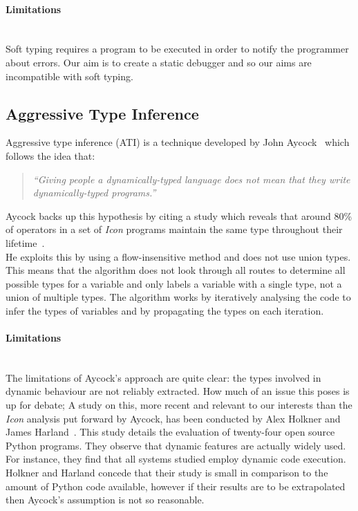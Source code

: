 \documentclass[12pt, titlepage]{article}
\begin{document}
\paragraph{Limitations}\mbox{} \\
Soft typing requires a program to be executed in order to notify the programmer about errors. Our aim is to create a static debugger and so our aims are incompatible with soft typing.

\subsection{Aggressive Type Inference}
Aggressive type inference (ATI) is a technique developed by John Aycock~\cite{aggressiveType} which follows the idea that:
\begin{quote}
	\emph{``Giving people a dynamically-typed language does not mean that they write dynamically-typed programs.''}
\end{quote}
Aycock backs up this hypothesis by citing a study which reveals that around 80\% of operators in a set of \textit{Icon} programs maintain the same type throughout their lifetime~\cite{typeInferenceIcon}. \\
\indent He exploits this by using a flow-insensitive method and does not use union types. This means that the algorithm does not look through all routes to determine all possible types for a variable and only labels a variable with a single type, not a union of multiple types. The algorithm works by iteratively analysing the code to infer the types of variables and by propagating the types on each iteration.
\paragraph{Limitations}\mbox{}\\
The limitations of Aycock's approach are quite clear: the types involved in dynamic behaviour are not reliably extracted. How much of an issue this poses is up for debate;
A study on this, more recent and relevant to our interests than the \textit{Icon} analysis put forward by Aycock, has been conducted by Alex Holkner and James Harland~\cite{evaluatingDynamicBehaviour}. This study details the evaluation of twenty-four open source Python programs. They observe that dynamic features are actually widely used. For instance, they find that all systems studied employ dynamic code execution. Holkner and Harland concede that their study is small in comparison to the amount of Python code available, however if their results are to be extrapolated then Aycock's assumption is not so reasonable.
\end{document}
